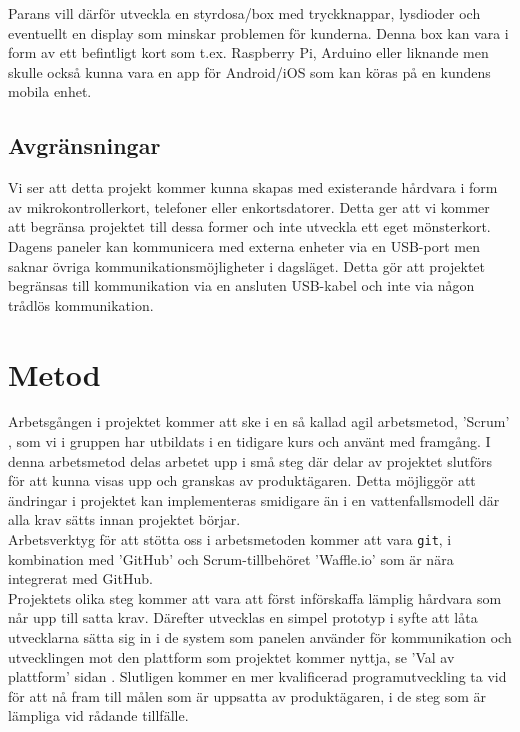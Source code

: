 \documentclass[a4paper]{article}
\begin{document}
			\noindent Parans vill därför utveckla en styrdosa/box med tryckknappar, lysdioder och eventuellt en display som minskar problemen för kunderna.
			Denna box kan vara i form av ett befintligt kort som t.ex. Raspberry Pi, Arduino eller liknande men skulle också kunna vara en app för Android/iOS som kan köras på en kundens mobila enhet.

		\subsection{Avgränsningar} %
		\label{sub:avgransningar}
			
			Vi ser att detta projekt kommer kunna skapas med existerande hårdvara i form av mikrokontrollerkort, telefoner eller enkortsdatorer. Detta ger att vi kommer att begränsa projektet till dessa former och inte utveckla ett eget mönsterkort.\\

			\noindent Dagens paneler kan kommunicera med externa enheter via en USB-port men saknar övriga kommunikationsmöjligheter i dagsläget. Detta gör att projektet begränsas till kommunikation via en ansluten USB-kabel och inte via någon trådlös kommunikation.


	\newpage

	\section{Metod} %
	\label{sec:metod}
		Arbetsgången i projektet kommer att ske i en så kallad agil arbetsmetod, 'Scrum' , som vi i gruppen har utbildats i en tidigare kurs och använt med framgång. I denna arbetsmetod delas arbetet upp i små steg där delar av projektet slutförs för att kunna visas upp och granskas av produktägaren. Detta möjliggör att ändringar i projektet kan implementeras smidigare än i en vattenfallsmodell där alla krav sätts innan projektet börjar. \\

		\noindent Arbetsverktyg för att stötta oss i arbetsmetoden kommer att vara \texttt{git}, i kombination med 'GitHub' och Scrum-tillbehöret 'Waffle.io'  som är nära integrerat med GitHub. \\

		\noindent Projektets olika steg kommer att vara att först införskaffa lämplig hårdvara som når upp till satta krav. Därefter utvecklas en simpel prototyp i syfte att låta utvecklarna sätta sig in i de system som panelen använder för kommunikation och utvecklingen mot den plattform som projektet kommer nyttja, se 'Val av plattform' sidan \pageref{sec:val_av_plattform}. Slutligen kommer en mer kvalificerad programutveckling ta vid för att nå fram till målen som är uppsatta av produktägaren, i de steg som är lämpliga vid rådande tillfälle.
\end{document}
